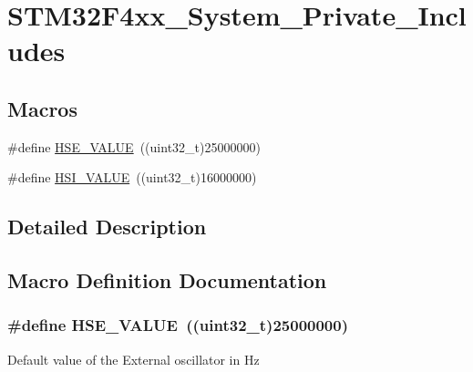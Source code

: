 \hypertarget{group___s_t_m32_f4xx___system___private___includes}{}\section{S\+T\+M32\+F4xx\+\_\+\+System\+\_\+\+Private\+\_\+\+Includes}
\label{group___s_t_m32_f4xx___system___private___includes}
\subsection*{Macros}
\begin{DoxyCompactItemize}
\item 
\#define \hyperlink{group___s_t_m32_f4xx___system___private___includes_gaeafcff4f57440c60e64812dddd13e7cb}{H\+S\+E\+\_\+\+V\+A\+L\+UE}~((uint32\+\_\+t)25000000)
\item 
\#define \hyperlink{group___s_t_m32_f4xx___system___private___includes_gaaa8c76e274d0f6dd2cefb5d0b17fbc37}{H\+S\+I\+\_\+\+V\+A\+L\+UE}~((uint32\+\_\+t)16000000)
\end{DoxyCompactItemize}


\subsection{Detailed Description}


\subsection{Macro Definition Documentation}
\subsubsection[{\texorpdfstring{H\+S\+E\+\_\+\+V\+A\+L\+UE}{HSE_VALUE}}]{\setlength{\rightskip}{0pt plus 5cm}\#define H\+S\+E\+\_\+\+V\+A\+L\+UE~((uint32\+\_\+t)25000000)}\hypertarget{group___s_t_m32_f4xx___system___private___includes_gaeafcff4f57440c60e64812dddd13e7cb}{}\label{group___s_t_m32_f4xx___system___private___includes_gaeafcff4f57440c60e64812dddd13e7cb}
Default value of the External oscillator in Hz 

